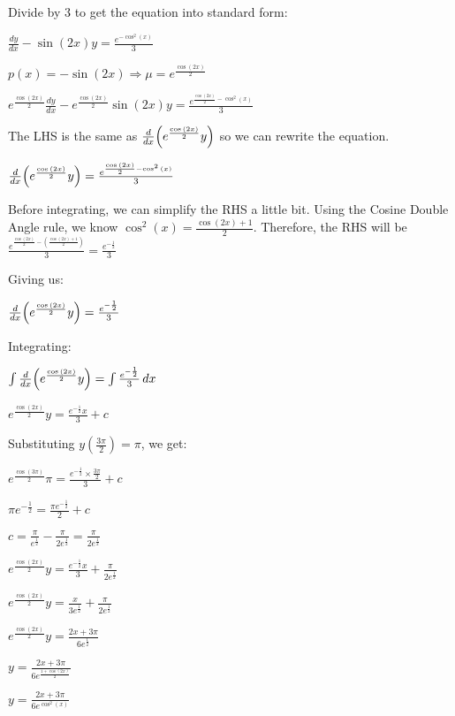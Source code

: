 \documentclass[../main.tex]{subfiles}
\begin{document}
\begin{enumerate}[itemsep=0.7cm]
    Divide by 3 to get the equation into standard form:

    $\frac{dy}{dx}-\sin{(2x)}y=\frac{e^{-\cos^2{(x)}}}{3}$

    $p(x)=-\sin{(2x)} \Rightarrow \mu=e^{\frac{\cos{(2x)}}{2}}$

    $e^{\frac{\cos{(2x)}}{2}}\frac{dy}{dx}-e^{\frac{\cos{(2x)}}{2}}\sin{(2x)}y=\frac{e^{\frac{\cos{(2x)}}{2}-\cos^2{(x)}}}{3}$

    The LHS is the same as $\frac{d}{dx}\Bigl(e^{\frac{\cos{(2x)}}{2}}y\Bigr)$ so we can rewrite the equation.

    $\frac{d}{dx}\Bigl(e^{\frac{\cos{(2x)}}{2}}y\Bigr)=\frac{e^{\frac{\cos{(2x)}}{2}-\cos^2{(x)}}}{3}$

    Before integrating, we can simplify the RHS a little bit. Using the Cosine Double Angle rule, we know $\cos^2{(x)}=\frac{\cos{(2x)}+1}{2}$. Therefore, the RHS will be $\frac{e^{\frac{\cos{(2x)}}{2}-(\frac{\cos{(2x)}+1}{2})}}{3}=\frac{e^{-\frac{1}{2}}}{3}$

    Giving us:

    $\frac{d}{dx}\Bigl(e^{\frac{\cos{(2x)}}{2}}y\Bigr)=\frac{e^{-\frac{1}{2}}}{3}$

    Integrating:

    $\int \frac{d}{dx}\Bigl(e^{\frac{\cos{(2x)}}{2}}y\Bigr)=\int \frac{e^{-\frac{1}{2}}}{3}\,dx$

    $e^{\frac{\cos{(2x)}}{2}}y=\frac{e^{-\frac{1}{2}}x}{3}+c$
    
    Substituting $y(\frac{3\pi}{2})=\pi$, we get:

    $e^{\frac{\cos{(3\pi)}}{2}}\pi=\frac{e^{-\frac{1}{2}}\times \frac{3\pi}{2}}{3}+c$

    $\pi e^{-\frac{1}{2}}=\frac{\pi e^{-\frac{1}{2}}}{2}+c$

    $c=\frac{\pi}{e^{\frac{1}{2}}}-\frac{\pi}{2e^{\frac{1}{2}}}=\frac{\pi}{2e^{\frac{1}{2}}}$

    $e^{\frac{\cos{(2x)}}{2}}y=\frac{e^{-\frac{1}{2}}x}{3}+\frac{\pi}{2e^{\frac{1}{2}}}$

    $e^{\frac{\cos{(2x)}}{2}}y=\frac{x}{3e^{\frac{1}{2}}}+\frac{\pi}{2e^{\frac{1}{2}}}$

    $e^{\frac{\cos{(2x)}}{2}}y=\frac{2x+3\pi}{6e^{\frac{1}{2}}}$

    $y=\frac{2x+3\pi}{6e^{\frac{1+\cos{(2x)}}{2}}}$

    $y=\frac{2x+3\pi}{6e^{\cos^2{(x)}}}$

\end{enumerate}
\end{document}
